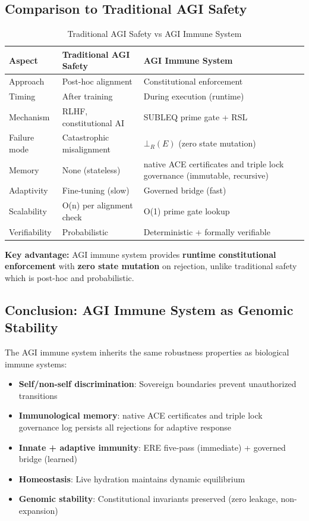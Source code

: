 \documentclass[11pt,a4paper]{article}
\begin{document}
\subsection{Comparison to Traditional AGI Safety}

\begin{table}[h]
\centering
\caption{Traditional AGI Safety vs AGI Immune System}
\label{tab:safety_comparison}
\begin{tabular}{@{}l l l@{}}
\toprule
\textbf{Aspect} & \textbf{Traditional AGI Safety} & \textbf{AGI Immune System} \\
\midrule
Approach & Post-hoc alignment & Constitutional enforcement \\
Timing & After training & During execution (runtime) \\
Mechanism & RLHF, constitutional AI & SUBLEQ prime gate + RSL \\
Failure mode & Catastrophic misalignment & $\bot_R(E)$ (zero state mutation) \\
Memory & None (stateless) & native ACE certificates and triple lock governance (immutable, recursive) \\
Adaptivity & Fine-tuning (slow) & Governed bridge (fast) \\
Scalability & O(n) per alignment check & O(1) prime gate lookup \\
Verifiability & Probabilistic & Deterministic + formally verifiable \\
\bottomrule
\end{tabular}
\end{table}

\textbf{Key advantage:} AGI immune system provides \textbf{runtime constitutional enforcement} with \textbf{zero state mutation} on rejection, unlike traditional safety which is post-hoc and probabilistic.

\subsection{Conclusion: AGI Immune System as Genomic Stability}

The AGI immune system inherits the same robustness properties as biological immune systems:
\begin{itemize}
    \item \textbf{Self/non-self discrimination}: Sovereign boundaries prevent unauthorized transitions
    \item \textbf{Immunological memory}: native ACE certificates and triple lock governance log persists all rejections for adaptive response
    \item \textbf{Innate + adaptive immunity}: ERE five-pass (immediate) + governed bridge (learned)
    \item \textbf{Homeostasis}: Live hydration maintains dynamic equilibrium
    \item \textbf{Genomic stability}: Constitutional invariants preserved (zero leakage, non-expansion)
\end{itemize}
\end{document}
